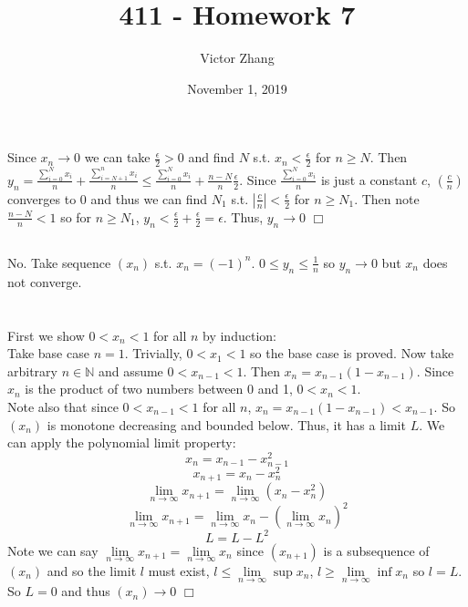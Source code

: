 \documentclass{article}
\title{411 - Homework 7}
\author{Victor Zhang }
\date{November 1, 2019}
\begin{document}
\maketitle

\section{}
\subsection{}
Since $x_n \rightarrow 0$ we can take $\frac{\epsilon}{2}>0$ and find $N$ s.t. $x_n < \frac{\epsilon}{2}$ for $n\geq N$. Then $y_n = \frac{\sum\limits_{i=0}^N x_i}{n} + \frac{\sum\limits_{i = N+1}^n x_i}{n} \leq \frac{\sum\limits_{i=0}^N x_i}{n} + \frac{n-N}{n}\frac{\epsilon}{2}$. Since $\frac{\sum\limits_{i=0}^N x_i}{n}$ is just a constant $c$, $(\frac{c}{n})$ converges to 0 and thus we can find $N_1$ s.t. $|\frac{c}{n}| < \frac{\epsilon}{2}$ for $n \geq N_1$. Then note $\frac{n-N}{n} < 1$ so for $n\geq N_1$, $y_n < \frac{\epsilon}{2} + \frac{\epsilon}{2} = \epsilon$. Thus, $y_n \rightarrow 0$ $\Box$

\subsection{}
No. Take sequence $(x_n)$ s.t. $x_n = (-1)^n$. $0\leq y_n \leq \frac{1}{n}$ so $y_n \rightarrow 0$ but $x_n$ does not converge.

\section{}
First we show $0<x_n<1$ for all $n$ by induction:\\
Take base case $n=1$. Trivially, $0<x_1<1$ so the base case is proved. Now take arbitrary $n\in\mathbb{N}$ and assume $0<x_{n-1}<1$. Then $x_n = x_{n-1}(1-x_{n-1})$. Since $x_n$ is the product of two numbers between 0 and 1, $0<x_n<1$.\\
Note also that since $0<x_{n-1} < 1$ for all $n$, $x_n = x_{n-1}(1-x_{n-1}) < x_{n-1}$. So $(x_n)$ is monotone decreasing and bounded below. Thus, it has a limit $L$. We can apply the polynomial limit property:
$$x_n = x_{n-1} - x_{n-1}^2$$
$$x_{n+1} = x_{n} - x_{n}^2$$
$$\lim\limits_{n\rightarrow\infty} x_{n+1} = \lim\limits_{n\rightarrow\infty} (x_{n} - x_{n}^2)$$
$$\lim\limits_{n\rightarrow\infty} x_{n+1} = \lim\limits_{n\rightarrow\infty} x_{n} - (\lim\limits_{n\rightarrow\infty} x_{n})^2$$
$$L = L - L^2$$
Note we can say $\lim\limits_{n\rightarrow\infty} x_{n+1} = \lim\limits_{n\rightarrow\infty} x_{n}$ since $(x_{n+1})$ is a subsequence of $(x_n)$ and so the limit $l$ must exist, $l\leq\lim\limits_{n\rightarrow\infty}\sup x_n$, $l\geq\lim\limits_{n\rightarrow\infty}\inf x_n$ so $l = L$. So $L = 0$ and thus $(x_n) \rightarrow 0$ $\Box$
\end{document}
